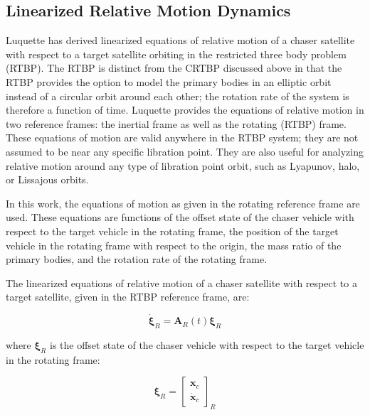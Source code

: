 \documentclass[letterpaper, preprint, paper,11pt]{AAS}	%
\begin{document}
\subsection{Linearized Relative Motion Dynamics}
Luquette has derived linearized equations of relative motion of a chaser satellite with respect to a target satellite orbiting in the restricted three body problem (RTBP).\cite{luquette2004} The RTBP is distinct from the CRTBP discussed above in that the RTBP provides the option to model the primary bodies in an elliptic orbit instead of a circular orbit around each other; the rotation rate of the system is therefore a function of time. Luquette provides the equations of relative motion in two reference frames: the inertial frame as well as the rotating (RTBP) frame.  These equations of motion are valid anywhere in the RTBP system; they are not assumed to be near any specific libration point.  They are also useful for analyzing relative motion around any type of libration point orbit, such as Lyapunov, halo, or Lissajous orbits. 

In this work, the equations of motion as given in the rotating reference frame are used. These equations are functions of the offset state of the chaser vehicle with respect to the target vehicle in the rotating frame, the position of the target vehicle in the rotating frame with respect to the origin, the mass ratio of the primary bodies, and the rotation rate of the rotating frame.


The linearized equations of relative motion of a chaser satellite with respect to a target satellite, given in the RTBP reference frame, are:

\begin{equation} \label{eq:RelmoDerivs}
	\dot{\boldsymbol{\xi}}_R = \mathbf{A}_R(t)\boldsymbol{\xi}_R
\end{equation}

where \(\boldsymbol{\xi}_R\) is the offset state of the chaser vehicle with respect to the target vehicle in the rotating frame:

\begin{equation}  %
	\boldsymbol{\xi}_R = \begin{bmatrix}
		\mathbf{x}_c \\
		\dot{\mathbf{x}}_c
	\end{bmatrix}_R
\end{equation}
\end{document}

